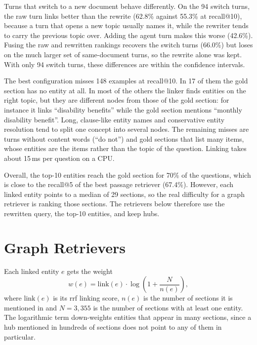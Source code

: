 Turns that switch to a new document behave differently. On the 94 switch turns, the raw
turn links better than the rewrite (62.8\% against 55.3\% at recall@10), because a turn
that opens a new topic usually names it, while the rewriter tends to carry the previous
topic over. Adding the agent turn makes this worse (42.6\%). Fusing the raw and
rewritten rankings recovers the switch turns (66.0\%) but loses on the much larger set
of same-document turns, so the rewrite alone was kept. With only 94 switch turns, these
differences are within the confidence intervals.

The best configuration misses 148 examples at recall@10. In 17 of them the gold section
has no entity at all. In most of the others the linker finds entities on the right
topic, but they are different nodes from those of the gold section: for instance it
links ``disability benefits'' while the gold section mentions ``monthly disability
benefit''. Long, clause-like entity names and conservative entity resolution tend to
split one concept into several nodes. The remaining misses are turns without content
words (``do not'') and gold sections that list many items, whose entities are the items
rather than the topic of the question. Linking takes about 15\,ms per question on a CPU.

Overall, the top-10 entities reach the gold section for 70\% of the questions, which is
close to the recall@5 of the best passage retriever (67.4\%). However, each linked entity
points to a median of 29 sections, so the real difficulty for a graph retriever is
ranking those sections. The retrievers below therefore use the rewritten query, the
top-10 entities, and keep hubs.


\section{Graph Retrievers}\label{sec:kgret:retrievers}

Each linked entity $e$ gets the weight
\[
    w(e) = \mathrm{link}(e) \cdot \log\left(1 + \frac{N}{n(e)}\right),
\]
where $\mathrm{link}(e)$ is its \gls{rrf} linking score, $n(e)$ is the number of sections
it is mentioned in and $N = 3{,}355$ is the number of sections with at least one entity.
The logarithmic term down-weights entities that appear in many sections, since a hub
mentioned in hundreds of sections does not point to any of them in particular.

